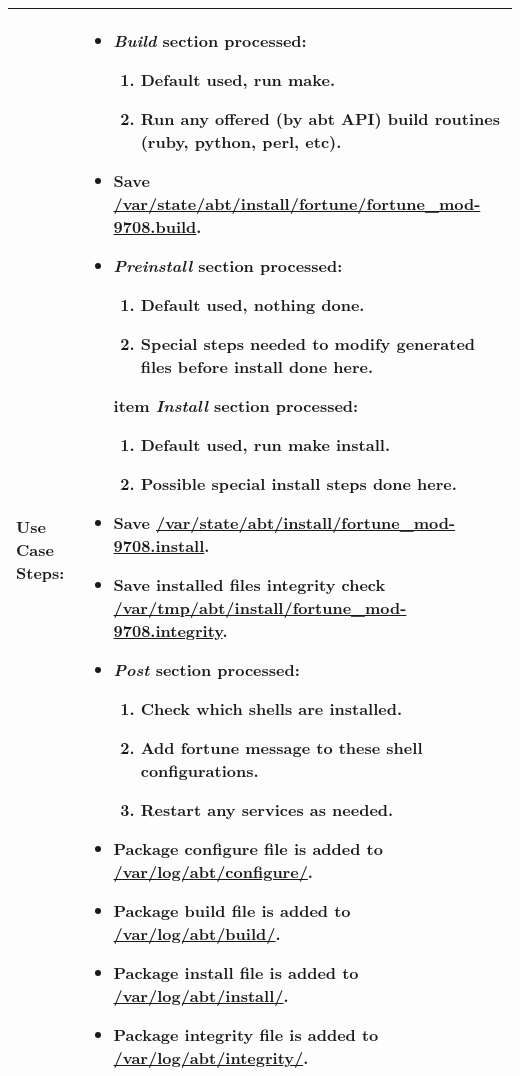 \begin{tabularx}{\linewidth}{|l|X|}
\hline
\textbf{Use Case Steps:} & 
\begin{minipage}{\linewidth}
  \vspace{0.05em}
  \begin{itemize}
    \item \emph{Build} section processed:
    \begin{enumerate}
      \item Default used, run \textbf{make}.
      \item Run any offered (by abt API) build routines (ruby, python, perl, etc).
    \end{enumerate}
    \item Save \url{/var/state/abt/install/fortune/fortune_mod-9708.build}.
    \item \emph{Preinstall} section processed:
    \begin{enumerate}
      \item Default used, nothing done.
      \item Special steps needed to modify generated files before install done here.
    \end{enumerate}
    item \emph{Install} section processed:
    \begin{enumerate}
      \item Default used, run \textbf{make install}.
      \item Possible special install steps done here.
    \end{enumerate}
    \item Save \url{/var/state/abt/install/fortune_mod-9708.install}.
    \item Save installed files integrity check \url{/var/tmp/abt/install/fortune_mod-9708.integrity}.
    \item \emph{Post} section processed:
    \begin{enumerate}
      \item Check which shells are installed.
      \item Add fortune message to these shell configurations.
      \item Restart any services as needed.
    \end{enumerate}
    \item Package configure file is added to \url{/var/log/abt/configure/}.
    \item Package build file is added to \url{/var/log/abt/build/}.
    \item Package install file is added to \url{/var/log/abt/install/}.
    \item Package integrity file is added to \url{/var/log/abt/integrity/}.
  \end{itemize}
  \vspace{0.05em}
\end{minipage}
\\
\hline 
\end{tabularx}


